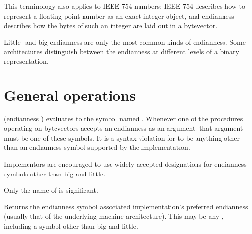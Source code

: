This terminology also applies to IEEE-754 numbers: IEEE-754 describes
how to represent a floating-point number as an exact integer object, and
endianness describes how the bytes of such an integer are laid out in
a bytevector.

\begin{note}
  Little- and big-endianness are only the most common kinds of
  endianness.  Some architectures distinguish between the endianness
  at different levels of a binary representation.
\end{note}

\section{General operations}

\begin{entry}{%
}

  {\cf (endianness )} evaluates to
the symbol named .  Whenever one of the
procedures operating on bytevectors accepts an endianness as an
argument, that argument must be one of these symbols.  It is a syntax
violation for  to be anything other than an
endianness symbol supported by the implementation.

\begin{note}
  Implementors are encouraged to use widely accepted designations
  for endianness symbols other than {\cf big} and {\cf little}.
\end{note}

\begin{note}
  Only the name of  is significant.
\end{note}
\end{entry}

\begin{entry}{%
}

Returns the endianness symbol associated implementation's preferred
endianness (usually that of the underlying machine architecture).
This may be any , including a symbol other
than {\cf big} and {\cf little}.
\end{entry}   

